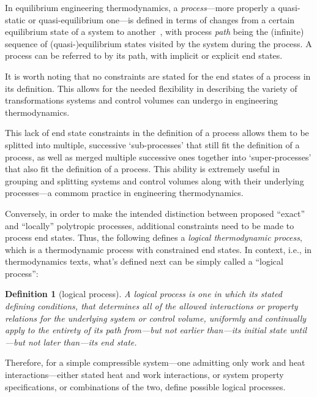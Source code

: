 \documentclass[fleqn,11pt]{SelfArx}
\newtheorem{definition}{Definition}
\begin{document}
    In equilibrium engineering thermodynamics, a \emph{process}---more properly  a  quasi-static
    or quasi-equilibrium one---is defined in terms of changes from a certain  equilibrium  state
    of a system to another~\cite{2013-CengelYA+BolesMA-AMGH}, with process \emph{path} being the
    (infinite) sequence of (quasi-)equilibrium states visited by the system during the  process.
    A process can be referred to by its path, with implicit or explicit end states.

    It is worth noting that no constraints are stated for the end states of  a  process  in  its
    definition.  This  allows  for  the  needed  flexibility  in  describing  the   variety   of
    transformations systems and control volumes can undergo in engineering thermodynamics.

    This lack of end state constraints in the definition of a process allows them to be splitted
    into multiple, successive `sub-processes' that still fit the definition  of  a  process,  as
    well as merged multiple successive ones together into `super-processes' that  also  fit  the
    definition of a process. This ability is extremely useful in grouping and splitting  systems
    and control volumes along with their underlying processes---a commom practice in engineering
    thermodynamics.

    Conversely, in order to  make  the  intended  distinction  between  proposed  ``exact''  and
    ``locally'' polytropic processes, additional constraints need to  be  made  to  process  end
    states. Thus, the following defines a  \emph{logical  thermodynamic  process},  which  is  a
    thermodynamic process with constrained end  states.  In  context,  i.e.,  in  thermodynamics
    texts, what's defined next can be simply called a ``logical process'':

    \begin{definition}[logical process]\label{def:logical.proc}
        A logical process is one in which its stated defining conditions, that determines all of
        the allowed interactions or property relations for  the  underlying  system  or  control
        volume, uniformly and continually apply to the  entirety  of  its  path  from---but  not
        earlier than---its initial state until---but not later than---its end state.
    \end{definition}

    Therefore,  for  a  simple  compressible  system---one  admitting   only   work   and   heat
    interactions---either stated heat and work interactions, or system property  specifications,
    or combinations of the two, define possible logical processes.
\end{document}
